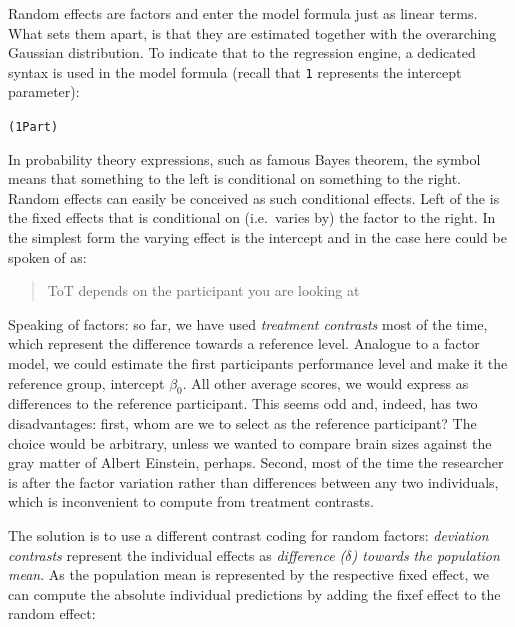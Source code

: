 \documentclass[]{svmono}
\newenvironment{Shaded}{\begin{snugshade}}{\end{snugshade}}
\newcommand{\KeywordTok}[1]{\textcolor[rgb]{0.13,0.29,0.53}{\textbf{#1}}}
\newcommand{\DataTypeTok}[1]{\textcolor[rgb]{0.13,0.29,0.53}{#1}}
\newcommand{\StringTok}[1]{\textcolor[rgb]{0.31,0.60,0.02}{#1}}
\newcommand{\OperatorTok}[1]{\textcolor[rgb]{0.81,0.36,0.00}{\textbf{#1}}}
\newcommand{\NormalTok}[1]{#1}
\theoremstyle{definition}
\theoremstyle{definition}
\theoremstyle{definition}
\theoremstyle{remark}
\begin{document}
Random effects are factors and enter the model formula just as linear
terms. What sets them apart, is that they are estimated together with
the overarching Gaussian distribution. To indicate that to the
regression engine, a dedicated syntax is used in the model formula
(recall that \texttt{1} represents the intercept parameter):

\texttt{(1\textbar{}Part)}

In probability theory expressions, such as famous Bayes theorem, the
\texttt{\textbar{}} symbol means that something to the left is
conditional on something to the right. Random effects can easily be
conceived as such conditional effects. Left of the \texttt{\textbar{}}
is the fixed effects that is conditional on (i.e.~varies by) the factor
to the right. In the simplest form the varying effect is the intercept
and in the case here could be spoken of as:

\begin{quote}
ToT depends on the participant you are looking at
\end{quote}

Speaking of factors: so far, we have used \emph{treatment contrasts}
most of the time, which represent the difference towards a reference
level. Analogue to a factor model, we could estimate the first
participants performance level and make it the reference group,
intercept \(\beta_0\). All other average scores, we would express as
differences to the reference participant. This seems odd and, indeed,
has two disadvantages: first, whom are we to select as the reference
participant? The choice would be arbitrary, unless we wanted to compare
brain sizes against the gray matter of Albert Einstein, perhaps. Second,
most of the time the researcher is after the factor variation rather
than differences between any two individuals, which is inconvenient to
compute from treatment contrasts.

The solution is to use a different contrast coding for random factors:
\emph{deviation contrasts} represent the individual effects as
\emph{difference (\(\delta\)) towards the population mean}. As the
population mean is represented by the respective fixed effect, we can
compute the absolute individual predictions by adding the fixef effect
to the random effect:

\begin{Shaded}
\end{Shaded}
\end{document}
